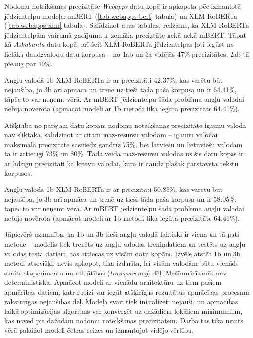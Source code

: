 

Nodomu noteikšanas precizitāte \textit{Webapps} datu kopā ir apkopota pēc izmantotā jēdzientelpu modeļa: mBERT (\ref{tab:webapps-bert} tabula) un XLM-RoBERTa (\ref{tab:webapps-xlm} tabula). Salīdzinot abas tabulas, redzams, ka XLM-RoBERTa jēdzientelpām vairumā gadījumu ir zemāka preciztāte nekā nekā mBERT. Tāpat kā \textit{Askubuntu} datu kopā, arī šeit XLM-RoBERTa jēdzientelpas ļoti iegūst no lielāka daudzvalodu datu korpusa -- no 1ab un 3a vidējās 47\% precizitātes, 2ab tā pieaug par 19\%. 


Angļu valodā 1b XLM-RoBERTa ir ar precizitāti 42.37\%, kas varētu būt nejaušība, jo 3b arī apmāca un trenē uz tieši tāda paša korpusa un ir 64.41\%, tāpēc to var neņemt vērā. Ar mBERT jēdzientelpu šāda problēma angļu valodai nebija novērota (apmācot modeli ar 1b metodi tika iegūta precizitāte 64.41\%).

Atšķirībā no pārējām datu kopām nodomu noteikšanas precizitāte igauņu valodā nav sliktāka, salīdzinot ar citām maz-resursu valodām -- igauņu valodai maksimālā precizitāte sasniedz gandrīz 75\%, bet latviešu un lietuviešu valodām tā ir attiecīgi 73\% un 80\%. Tādā veidā maz-resursu valodas uz šīs datu kopas ir ar līdzīgu precizitāti kā krievu valodai, kura ir daudz plašāk pārstāvēta tekstu korpusos.



Angļu valodā 1b XLM-RoBERTa ir ar precizitāti 50.85\%, kas varētu būt nejaušība, jo 3b arī apmāca un trenē uz tieši tāda paša korpusa un ir 58.05\%, tāpēc to var neņemt vērā. Ar mBERT jēdzientelpu šāda problēma angļu valodai nebija novērota (apmācot modeli ar 1b metodi tika iegūta precizitāte 64.41\%).


Jāpievērš uzmanība, ka 1b un 3b tieši angļu valodā faktiski ir viena un tā pati metode -- modelis tiek trenēts uz angļu valodas treniņdatiem un testēts uz angļu valodas testa datiem, tas attiecas uz visām datu kopām. Izvēle atstāt 1b un 3b metodi atsevišķi, nevis apkopot, tika izdarīta, lai visām valodām būtu vienāds skaits eksperimentu un atklātības (\textit{transparency}) dēļ. Mašīnmācīsanās nav deterministiska. Apmācot modeli ar vienādu arhitektūru uz tiem pašiem apmācības datiem, katru reizi var iegūt atšķirīgus rezultātus apmācības procesam raksturīgās nejaušības dēļ. Modeļa svari tiek inicializēti nejauši, un apmācības laikā optimizācijas algoritms var konverģēt uz dažādiem lokāliem minimumiem, kas noved pie dažādām nodomu noteikšanas precizitātēm. Darbā tas tika ņemts vērā palaižot modeli četras reizes un izmantojot vidējo vērtību.



